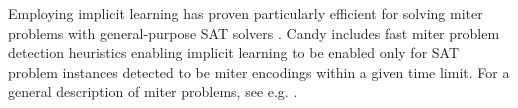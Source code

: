 \documentclass[conference]{IEEEtran}
\begin{document}
Employing implicit learning has proven particularly efficient for solving miter problems with general-purpose SAT solvers \cite{Kutzer:2016:Thesis}.
Candy includes fast miter problem detection heuristics enabling implicit learning to be enabled only for SAT problem instances detected to be miter encodings within a given time limit.
For a general description of miter problems, see e.g. \cite{hwmcc12Bench}.

    


%

\end{document}
